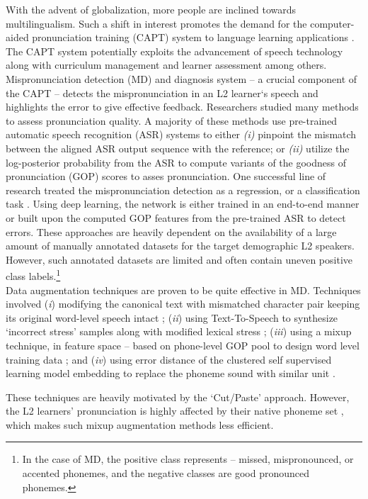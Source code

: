 \documentclass{INTERSPEECH2023}
\begin{document}
With the advent of globalization, more people are inclined towards multilingualism. Such a shift in interest promotes the demand for the computer-aided pronunciation training (CAPT) system to language learning applications \cite{CAPT,CAPT_2}. The CAPT system potentially exploits the advancement of speech technology along with curriculum management and learner assessment among others. Mispronunciation detection (MD) and diagnosis system -- a crucial component of the CAPT -- detects the mispronunciation in an L2 learner‘s speech and highlights the error to give effective feedback. 
Researchers studied many methods to assess pronunciation quality. A majority of these methods use pre-trained automatic speech recognition (ASR) systems to either \textit{(i)} pinpoint the mismatch between the aligned ASR output sequence with the reference; or \textit{(ii)} utilize the log-posterior probability from the ASR to compute variants of the goodness of pronunciation (GOP) scores \cite{GOP_WITT,GOP_1,GOP_2} to asses pronunciation.
One successful line of research treated the mispronunciation detection as a regression, or a classification task \cite{transfer_}. Using deep learning, the network is either trained in an end-to-end manner \cite{non_ASR,non_ASR_2,non_ASR_3,DNN_3} or built upon the computed GOP features from the pre-trained ASR \cite{JIM, likeJIM_asr, 3M} to detect errors. These approaches are heavily dependent on the availability of a large amount of manually annotated datasets for the target demographic L2 speakers. However, such annotated datasets are limited and often contain uneven positive class labels.\footnote{In the case of MD, the positive class represents -- missed, mispronounced, or accented phonemes, and the negative classes are good pronounced phonemes.}
\\
Data augmentation techniques are proven to be quite effective in MD. Techniques involved (\textit{i}) modifying the canonical text with mismatched character pair keeping its original word-level speech intact \cite{non_ASR_3}; (\textit{ii}) using Text-To-Speech to synthesize `incorrect stress' samples along with modified lexical stress \cite{l2_GEN_SSL}; (\textit{iii}) using a mixup technique, in feature space -- based on phone-level GOP pool to design word level training data \cite{mixup}; and (\textit{iv}) using error distance of the clustered self supervised learning model embedding to replace the phoneme sound with similar unit \cite{ssl, ssl_2}. 

These techniques are heavily motivated by the `Cut/Paste' approach. However, the L2 learners' pronunciation is highly affected by their native phoneme set \cite{L2_effect,l2_arctic}, which makes such mixup augmentation methods less efficient.
\end{document}
